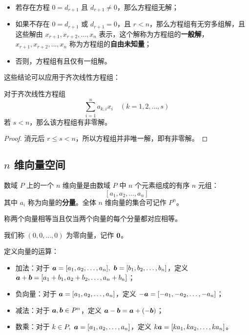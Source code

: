 \begin{itemize}
	\item 若存在方程 $0 = d_{r+1}$ 且 $d_{r+1} \neq 0$，那么方程组无解；
	\item 如果不存在 $0 = d_{r+1}$ 或 $d_{r+1} = 0$，且 $r<n$，那么方程组有无穷多组解，且这些解由 $x_{r+1},x_{r+2},\dots,x_n$ 表示，这个解称为方程组的\textbf{一般解}，$x_{r+1},x_{r+2},\dots,x_n$ 称为方程组的\textbf{自由未知量}；
	\item 否则，方程组有且仅有一组解。
\end{itemize}

这些结论可以应用于齐次线性方程组：

\begin{theorem}
	对于齐次线性方程组
	$$
	\sum_{i=1}^n a_{k,i} x_i \quad (k=1,2,\dots,s)
	$$
	若 $s < n$，那么该方程组有非零解。

	\begin{proof}
		消元后 $r \le s < n$，所以方程组并非唯一解，即有非零解。
	\end{proof}
\end{theorem}

\subsection{$n$ 维向量空间}

\begin{definition}[$n$ 维向量]
	数域 $P$ 上的一个 $n$ 维向量是由数域 $P$ 中 $n$ 个元素组成的有序 $n$ 元组：
	$$
	[a_1,a_2,\dots,a_n]
	$$
	其中 $a_i$ 称为向量的\textbf{分量}。全体 $n$ 维向量的集合可记作 $P^n$。
\end{definition}

\begin{definition}[向量相等]
	称两个向量相等当且仅当两个向量的每个分量都对应相等。
\end{definition}

\begin{definition}[零向量]
	我们称 $(0,0,\dots,0)$ 为零向量，记作 $\boldsymbol{0}$。
\end{definition}

\begin{definition}[向量运算]
	定义向量的运算：

	\begin{itemize}
		\item 加法：对于 $\boldsymbol{a} = [a_1,a_2,\dots,a_n],\ \boldsymbol{b} = [b_1,b_2,\dots,b_n]$，定义 $\boldsymbol{a} + \boldsymbol{b} = [a_1 + b_1, a_2 + b_2, \dots, a_n + b_n]$；
		\item 负向量：对于 $\boldsymbol{a} = [a_1,a_2,\dots,a_n]$，定义 $-\boldsymbol{a} = [-a_1, -a_2, \dots, -a_n]$；
		\item 减法：对于 $\boldsymbol{a},\boldsymbol{b} \in P^n$，定义 $\boldsymbol{a} - \boldsymbol{b} = \boldsymbol{a} + (-\boldsymbol{b})$；
		\item 数乘：对于 $k \in P,\ \boldsymbol{a} = [a_1,a_2,\dots,a_n]$，定义 $k\boldsymbol{a} = [k a_1, k a_2, \dots, k a_n]$。
	\end{itemize}
\end{definition}

